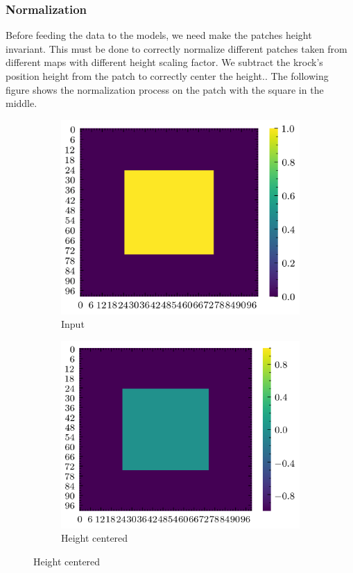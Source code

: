 \documentclass[../document.tex]{subfiles}
\begin{document}
\subsubsection{Normalization}
Before feeding the data to the models, we need make the patches height invariant. This must be done to correctly normalize different patches taken from different maps with different height scaling factor. We subtract the krock's position height from the patch to correctly center the height.. The following figure shows the normalization process on the patch with the square in the middle.
\begin{figure}[H]
    \begin{subfigure}[b]{0.5\textwidth}
        \includegraphics[width=\textwidth]{../img/data-aug/2d/square-middle.png}
        \caption{Input}
    \end{subfigure}
    \begin{subfigure}[b]{0.5\textwidth}
        \includegraphics[width=\textwidth]{../img/data-aug/2d/square-middle-center.png}
        \caption{Height centered}
    \end{subfigure}  
    

\end{figure}
\end{document}
